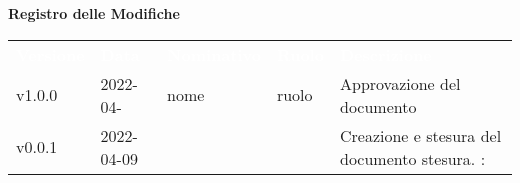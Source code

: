 

{\LARGE{\textbf{Registro delle Modifiche}}} \\
\begin{table}[!htbp]
\renewcommand{\arraystretch}{1.5}
\begin{tabular}{ m{}<{\centering}  m{}<{\centering}  m{}<{\centering}  m{}<{\centering}  m{}<{\centering} }
	\rowcolor{darkblue}
	\textcolor{white}{\textbf{Versione}} &\textcolor{white}{\textbf{Data}}& \textcolor{white}{\textbf{Nominativo}} & \textcolor{white}{\textbf{Ruolo}}&\textcolor{white}{\textbf{Descrizione}}\\ 

	v1.0.0 & 2022-04- & nome & ruolo & Approvazione del documento \\

	v0.0.1& 2022-04-09 & \PV & \AN &Creazione e stesura del documento stesura.  \VE: \textit{}\\

\end{tabular}
\end{table}

\pagebreak